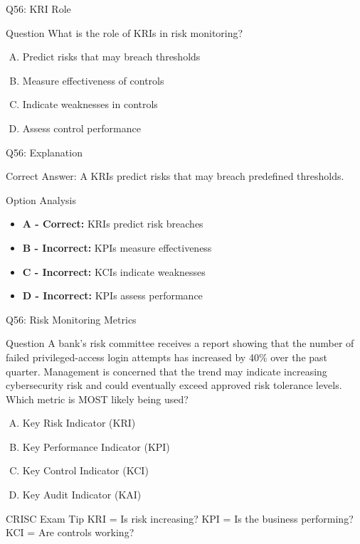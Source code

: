 \documentclass{beamer}
\begin{document}
	
	
	\begin{frame}{Q56: KRI Role}
		\begin{block}{Question}
			What is the role of KRIs in risk monitoring?
		\end{block}
		\begin{enumerate}[(A)]
			\item Predict risks that may breach thresholds
			\item Measure effectiveness of controls
			\item Indicate weaknesses in controls
			\item Assess control performance
		\end{enumerate}
	\end{frame}
	
	\begin{frame}{Q56: Explanation}
		\begin{block}{Correct Answer: A}
			KRIs predict risks that may breach predefined thresholds.
		\end{block}
		\begin{block}{Option Analysis}
			\begin{itemize}
				\item \textbf{A - Correct:} KRIs predict risk breaches
				\item \textbf{B - Incorrect:} KPIs measure effectiveness
				\item \textbf{C - Incorrect:} KCIs indicate weaknesses
				\item \textbf{D - Incorrect:} KPIs assess performance
			\end{itemize}
		\end{block}
	\end{frame}
	
	
	
	
	\begin{frame}{Q56: Risk Monitoring Metrics} \begin{block}{Question} A bank's risk committee receives a report showing that the number of failed privileged-access login attempts has increased by 40\% over the past quarter. Management is concerned that the trend may indicate increasing cybersecurity risk and could eventually exceed approved risk tolerance levels. Which metric is MOST likely being used? \end{block} \begin{enumerate}[(A)] \item Key Risk Indicator (KRI) \item Key Performance Indicator (KPI) \item Key Control Indicator (KCI) \item Key Audit Indicator (KAI) \end{enumerate}
	\begin{block}{CRISC Exam Tip} KRI = Is risk increasing? KPI = Is the business performing? KCI = Are controls working? \end{block}
	 \end{frame}
	
\end{document}
